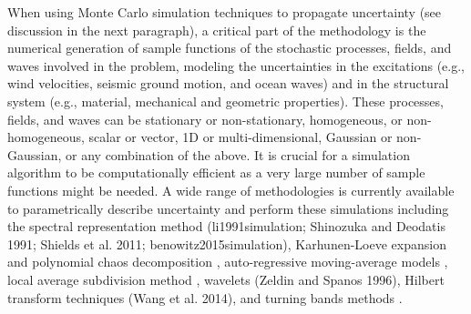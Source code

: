 When using Monte Carlo simulation techniques to propagate uncertainty (see discussion in the next paragraph), a critical part of the methodology is the numerical generation of sample functions of the stochastic processes, fields, and waves involved in the problem, modeling the uncertainties in the excitations (e.g., wind velocities, seismic ground motion, and ocean waves) and in the structural system (e.g., material, mechanical and geometric properties). These processes, fields, and waves can be stationary or non-stationary, homogeneous, or non-homogeneous, scalar or vector, 1D or multi-dimensional, Gaussian or non-Gaussian, or any combination of the above. It is crucial for a simulation algorithm to be computationally efficient as a very large number of sample functions might be needed. A wide range of methodologies is currently available to parametrically describe uncertainty and perform these simulations including the spectral representation method (li1991simulation; Shinozuka and Deodatis 1991; Shields et al. 2011; benowitz2015simulation), Karhunen-Loeve expansion and polynomial chaos decomposition \citep{ghanem1991stochastic}, auto-regressive moving-average models \citep{spanos1983arma,deodatis1988autoregressive}, local average subdivision method \citep{fenton1990simulation}, wavelets (Zeldin and Spanos 1996), Hilbert transform techniques (Wang et al. 2014), and turning bands methods \citep{mantoglou1982turning}.


